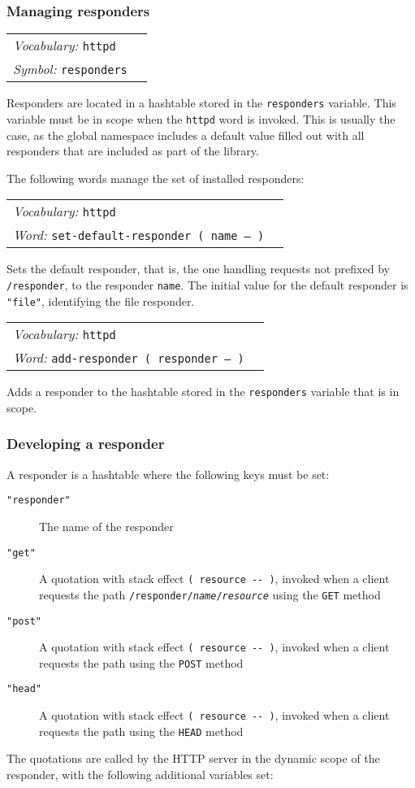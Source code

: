 \documentclass{book}
\newcommand{\vocabulary}[1]{\emph{Vocabulary:} \texttt{#1}&\\}
\newcommand{\ordinaryword}[2]{\index{\texttt{#1}}\emph{Word:} \texttt{#2}&\\}
\newcommand{\symbolword}[1]{\index{\texttt{#1}}\emph{Symbol:} \texttt{#1}&\\}
\newcommand{\wordtable}[1]{


\begin{tabularx}{12cm}{lX}
\hline
#1
\hline
\end{tabularx}

}
\begin{document}
\subsubsection{Managing responders}

\wordtable{
\vocabulary{httpd}
\symbolword{responders}
}
Responders are located in a hashtable stored in the \verb|responders| variable. This variable must be in scope when the \verb|httpd| word is invoked. This is usually the case, as the global namespace includes a default value filled out with all responders that are included as part of the library.

The following words manage the set of installed responders:

\wordtable{
\vocabulary{httpd}
\ordinaryword{set-default-responder}{set-default-responder ( name -- )}
}
Sets the default responder, that is, the one handling requests not prefixed by \verb|/responder|, to the responder \verb|name|. The initial value for the default responder is \verb|"file"|, identifying the file responder.
\wordtable{
\vocabulary{httpd}
\ordinaryword{add-responder}{add-responder ( responder -- )}
}
Adds a responder to the hashtable stored in the \verb|responders| variable that is in scope.

\subsubsection{Developing a responder}

A responder is a hashtable where the following keys must be set:

\begin{description}
\item[\texttt{"responder"}] The name of the responder
\item[\texttt{"get"}] A quotation with stack effect \verb|( resource -- )|, invoked when a client requests the path \texttt{/responder/\emph{name}/\emph{resource}} using the \texttt{GET} method
\item[\texttt{"post"}] A quotation with stack effect \verb|( resource -- )|, invoked when a client requests the path using the \texttt{POST} method
\item[\texttt{"head"}] A quotation with stack effect \verb|( resource -- )|, invoked when a client requests the path using the \texttt{HEAD} method
\end{description}

The quotations are called by the HTTP server in the dynamic scope of the responder, with the following additional variables set:
\end{document}
